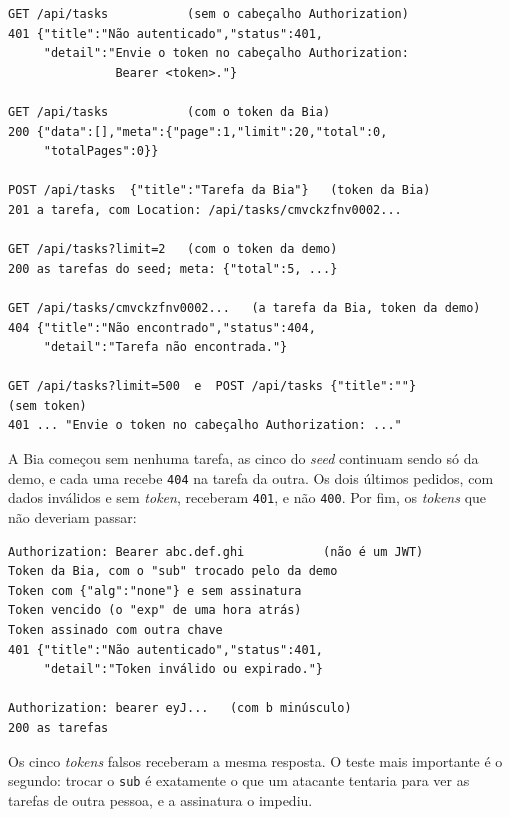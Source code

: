 \begin{codigo}
\begin{Verbatim}[breaklines=true, breaksymbolleft={}, fontsize=\footnotesize]
GET /api/tasks           (sem o cabeçalho Authorization)
401 {"title":"Não autenticado","status":401,
     "detail":"Envie o token no cabeçalho Authorization:
               Bearer <token>."}

GET /api/tasks           (com o token da Bia)
200 {"data":[],"meta":{"page":1,"limit":20,"total":0,
     "totalPages":0}}

POST /api/tasks  {"title":"Tarefa da Bia"}   (token da Bia)
201 a tarefa, com Location: /api/tasks/cmvckzfnv0002...

GET /api/tasks?limit=2   (com o token da demo)
200 as tarefas do seed; meta: {"total":5, ...}

GET /api/tasks/cmvckzfnv0002...   (a tarefa da Bia, token da demo)
404 {"title":"Não encontrado","status":404,
     "detail":"Tarefa não encontrada."}

GET /api/tasks?limit=500  e  POST /api/tasks {"title":""}
(sem token)
401 ... "Envie o token no cabeçalho Authorization: ..."
\end{Verbatim}
\end{codigo}

A Bia começou sem nenhuma tarefa, as cinco do \textit{seed} continuam sendo só da demo, e cada uma recebe \texttt{404} na tarefa da outra. Os dois últimos pedidos, com dados inválidos e sem \textit{token}, receberam \texttt{401}, e não \texttt{400}. Por fim, os \textit{tokens} que não deveriam passar:

\begin{codigo}
\begin{Verbatim}[breaklines=true, breaksymbolleft={}, fontsize=\footnotesize]
Authorization: Bearer abc.def.ghi           (não é um JWT)
Token da Bia, com o "sub" trocado pelo da demo
Token com {"alg":"none"} e sem assinatura
Token vencido (o "exp" de uma hora atrás)
Token assinado com outra chave
401 {"title":"Não autenticado","status":401,
     "detail":"Token inválido ou expirado."}

Authorization: bearer eyJ...   (com b minúsculo)
200 as tarefas
\end{Verbatim}
\end{codigo}

Os cinco \textit{tokens} falsos receberam a mesma resposta. O teste mais importante é o segundo: trocar o \texttt{sub} é exatamente o que um atacante tentaria para ver as tarefas de outra pessoa, e a assinatura o impediu.

